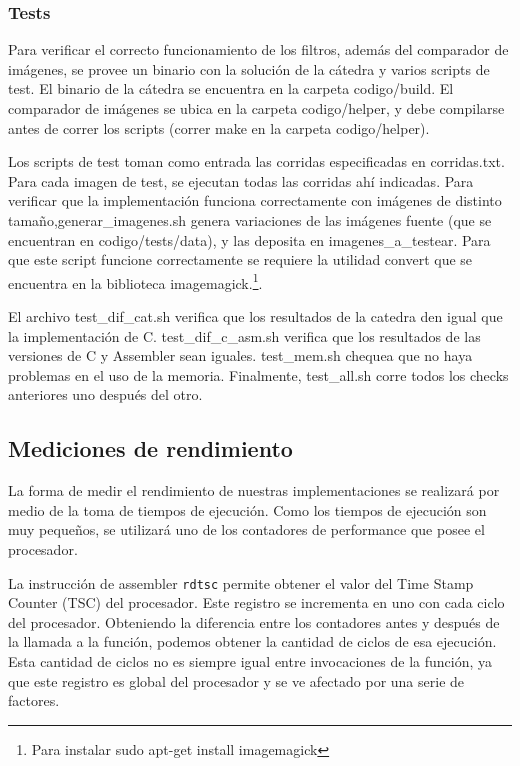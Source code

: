 \documentclass[a4paper, 12pt]{article}
\newcommand{\code}[1]{{\sffamily #1}\xspace}
\begin{document}
\subsubsection*{Tests}
Para verificar el correcto funcionamiento de los filtros,
además del comparador de imágenes, se provee un binario
con la solución de la cátedra y varios scripts de test.
El binario de la cátedra se encuentra en la carpeta {\code{codigo/build}}.
El comparador de imágenes se ubica en la carpeta {\code{codigo/helper}}, y debe
compilarse antes de correr los scripts (correr {\code{make}} en la carpeta {\code{codigo/helper}}).

Los scripts de test toman como entrada las corridas especificadas en {\code{corridas.txt}}.
Para cada imagen de test, se ejecutan todas las corridas ahí indicadas.
Para verificar que la implementación funciona correctamente con imágenes de distinto
tamaño,{ \code{generar\_imagenes.sh}} genera variaciones de las imágenes fuente
(que se encuentran en {\code{codigo/tests/data}}), y las deposita en {\code{imagenes\_a\_testear}}.
Para que este script funcione correctamente se requiere la utilidad {\code{convert}} que se encuentra
en la biblioteca {\code{imagemagick}}.\footnote{Para instalar \code{sudo apt-get install imagemagick}}.

El archivo {\code{test\_dif\_cat.sh}} verifica que los resultados de la catedra den igual que la implementación de C.
{\code{test\_dif\_c\_asm.sh}} verifica que los resultados de las versiones de C y Assembler sean iguales.
{\code{test\_mem.sh}} chequea que no haya problemas en el uso de la memoria.
Finalmente, {\code{test\_all.sh}} corre todos los checks anteriores uno después del otro.

\subsection{Mediciones de rendimiento}

La forma de medir el rendimiento de nuestras implementaciones se realizará por medio de la toma de tiempos de ejecución.
Como los tiempos de ejecución son muy pequeños, se utilizará uno de los contadores de performance que posee el procesador.

La instrucción de assembler \texttt{rdtsc} permite obtener el valor del Time Stamp Counter (TSC) del procesador.
Este registro se incrementa en uno con cada ciclo del procesador.
Obteniendo la diferencia entre los contadores antes y después de la llamada a la función, podemos obtener la cantidad de ciclos de esa ejecución.
Esta cantidad de ciclos no es siempre igual entre invocaciones de la función, ya que este registro es global del procesador y se ve afectado por una serie de factores.
\end{document}
